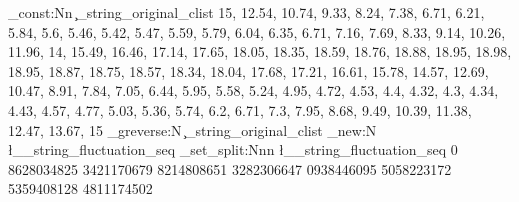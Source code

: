 \documentclass[tikz]{standalone}
\begin{document}
\ExplSyntaxOn
\clist_const:Nn \c_string_original_clist
  {
    15,    12.54, 10.74, 9.33,  8.24,  7.38,
    6.71,  6.21,  5.84,  5.6,   5.46,  5.42,
    5.47,  5.59,  5.79,  6.04,  6.35,  6.71,
    7.16,  7.69,  8.33,  9.14,  10.26, 11.96,
    14,    15.49, 16.46, 17.14, 17.65, 18.05,
    18.35, 18.59, 18.76, 18.88, 18.95, 18.98,
    18.95, 18.87, 18.75, 18.57, 18.34, 18.04,
    17.68, 17.21, 16.61, 15.78, 14.57, 12.69,
    10.47, 8.91,  7.84,  7.05,  6.44,  5.95,
    5.58,  5.24,  4.95,  4.72,  4.53,  4.4,  
    4.32,  4.3,   4.34,  4.43,  4.57,  4.77,
    5.03,  5.36,  5.74,  6.2,   6.71,  7.3,  
    7.95,  8.68,  9.49,  10.39, 11.38, 12.47, 13.67, 15
  }
\clist_greverse:N \c_string_original_clist
\seq_new:N \l__string_fluctuation_seq
\seq_set_split:Nnn \l__string_fluctuation_seq {}
  {
    0 8628034825 3421170679 8214808651 3282306647
      0938446095 5058223172 5359408128 4811174502
  }
\end{document}
